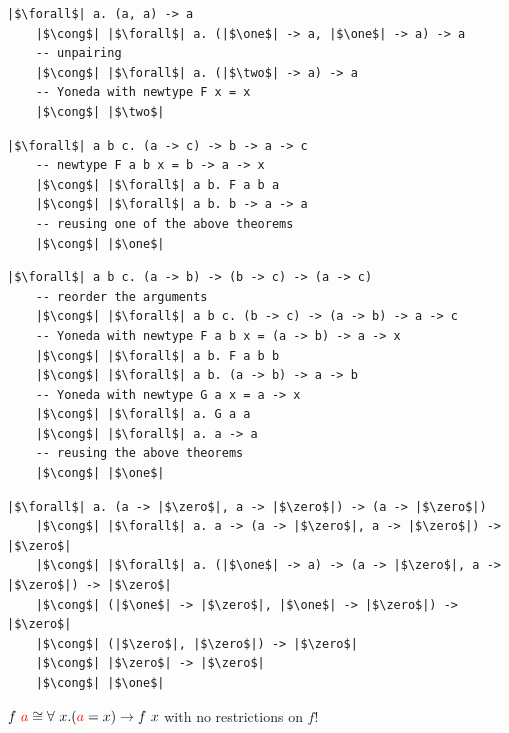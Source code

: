 \documentclass[tikz]{beamer}
\newcommand{\zero}{\bm{\mathbb{0}}}
\newcommand{\one}{\bm{\mathbb{1}}}
\newcommand{\two}{\bm{\mathbb{2}}}
\newcommand{\red}[1]{\textcolor{red}{#1}}
\theoremstyle{definition}
\begin{document}
\begin{frame}[fragile]
\begin{verbatim}
|$\forall$| a. (a, a) -> a
    |$\cong$| |$\forall$| a. (|$\one$| -> a, |$\one$| -> a) -> a
    -- unpairing 
    |$\cong$| |$\forall$| a. (|$\two$| -> a) -> a
    -- Yoneda with newtype F x = x
    |$\cong$| |$\two$|
\end{verbatim}
\end{frame}

\begin{frame}[fragile]
\begin{verbatim}
|$\forall$| a b c. (a -> c) -> b -> a -> c
    -- newtype F a b x = b -> a -> x
    |$\cong$| |$\forall$| a b. F a b a
    |$\cong$| |$\forall$| a b. b -> a -> a
    -- reusing one of the above theorems
    |$\cong$| |$\one$|
\end{verbatim}
\end{frame}

\begin{frame}[fragile]
\begin{verbatim}
|$\forall$| a b c. (a -> b) -> (b -> c) -> (a -> c)
    -- reorder the arguments
    |$\cong$| |$\forall$| a b c. (b -> c) -> (a -> b) -> a -> c
    -- Yoneda with newtype F a b x = (a -> b) -> a -> x
    |$\cong$| |$\forall$| a b. F a b b
    |$\cong$| |$\forall$| a b. (a -> b) -> a -> b
    -- Yoneda with newtype G a x = a -> x
    |$\cong$| |$\forall$| a. G a a
    |$\cong$| |$\forall$| a. a -> a
    -- reusing the above theorems
    |$\cong$| |$\one$|
\end{verbatim}
\end{frame}

\begin{frame}[fragile]
\begin{verbatim}
|$\forall$| a. (a -> |$\zero$|, a -> |$\zero$|) -> (a -> |$\zero$|)
    |$\cong$| |$\forall$| a. a -> (a -> |$\zero$|, a -> |$\zero$|) -> |$\zero$|
    |$\cong$| |$\forall$| a. (|$\one$| -> a) -> (a -> |$\zero$|, a -> |$\zero$|) -> |$\zero$|
    |$\cong$| (|$\one$| -> |$\zero$|, |$\one$| -> |$\zero$|) -> |$\zero$|
    |$\cong$| (|$\zero$|, |$\zero$|) -> |$\zero$|
    |$\cong$| |$\zero$| -> |$\zero$|
    |$\cong$| |$\one$|
\end{verbatim}
\end{frame}

\frame
{
\begin{definition}
    $f~\red{a} \cong \forall~x. (\red{a} = x) \to f~x$ with no restrictions on $f$!
\end{definition}
}
\end{document}
